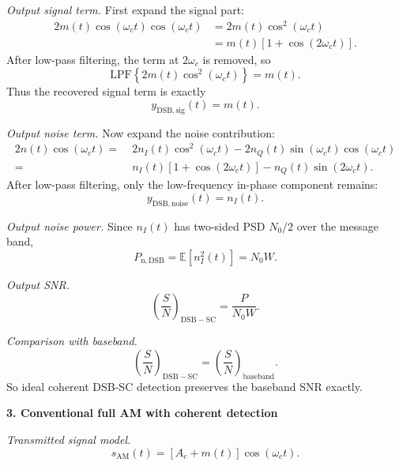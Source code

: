 \begin{tcolorbox}[breakable, colback=cyan!4!white, colframe=cyan!60!black,
title={\textbf{Intuition: Step-by-Step Output SNR Models Under AWGN}}]
\emph{Output signal term.}
First expand the signal part:
\begin{align}
2m(t)\cos(\omega_c t)\cos(\omega_c t)
&=
2m(t)\cos^2(\omega_c t)\nonumber\\
&=
m(t)\left[1+\cos(2\omega_c t)\right].
\end{align}
After low-pass filtering, the term at $2\omega_c$ is removed, so
\begin{equation}
\mathrm{LPF}\left\{2m(t)\cos^2(\omega_c t)\right\}=m(t).
\end{equation}
Thus the recovered signal term is exactly
\begin{equation}
y_{\mathrm{DSB, sig}}(t)=m(t).
\end{equation}

\emph{Output noise term.}
Now expand the noise contribution:
\begin{align}
2n(t)\cos(\omega_c t)
=\;&
2n_I(t)\cos^2(\omega_c t)
-2n_Q(t)\sin(\omega_c t)\cos(\omega_c t)\nonumber\\
=\;&
n_I(t)\left[1+\cos(2\omega_c t)\right]
-n_Q(t)\sin(2\omega_c t).
\end{align}
After low-pass filtering, only the low-frequency in-phase component remains:
\begin{equation}
y_{\mathrm{DSB, noise}}(t)=n_I(t).
\end{equation}

\emph{Output noise power.}
Since $n_I(t)$ has two-sided PSD $N_0/2$ over the message band,
\begin{equation}
P_{\mathrm{n,DSB}}
=
\mathbb{E}[n_I^2(t)]
=
N_0 W.
\end{equation}

\emph{Output SNR.}
\begin{equation}
\left(\frac{S}{N}\right)_{\mathrm{DSB-SC}}
=
\frac{P}{N_0 W}.
\end{equation}

\emph{Comparison with baseband.}
\begin{equation}
\left(\frac{S}{N}\right)_{\mathrm{DSB-SC}}
=
\left(\frac{S}{N}\right)_{\mathrm{baseband}}.
\end{equation}
So ideal coherent DSB-SC detection preserves the baseband SNR exactly.

\textbf{3. Conventional full AM with coherent detection}

\emph{Transmitted signal model.}
\begin{equation}
s_{\mathrm{AM}}(t)=\left[A_c+m(t)\right]\cos(\omega_c t).
\end{equation}


\end{tcolorbox}
